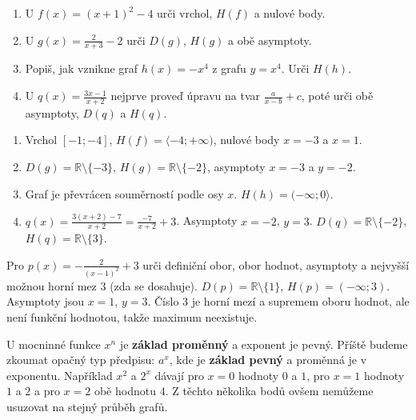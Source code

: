 \documentclass[11pt,a4paper]{article}
\begin{document}
\begin{zadaniReseniBox}[title={Samostatná práce 1}]
\begin{enumerate}[label=\alph*)]
\item U $f(x)=(x+1)^2-4$ urči vrchol, $H(f)$ a nulové body.
\item U $g(x)=\frac{2}{x+3}-2$ urči $D(g)$, $H(g)$ a obě asymptoty.
\item Popiš, jak vznikne graf $h(x)=-x^4$ z grafu $y=x^4$. Urči $H(h)$.
\item U $q(x)=\frac{3x-1}{x+2}$ nejprve proveď úpravu na tvar $\frac{a}{x-b}+c$, poté urči obě asymptoty, $D(q)$ a $H(q)$.
\end{enumerate}
\tcblower
\begin{enumerate}[label=\alph*)]
\item Vrchol $[-1;-4]$, $H(f)=\langle-4;+\infty)$, nulové body $x=-3$ a $x=1$.
\item $D(g)=\mathbb R\setminus\{-3\}$, $H(g)=\mathbb R\setminus\{-2\}$, asymptoty $x=-3$ a $y=-2$.
\item Graf je převrácen souměrností podle osy $x$. $H(h)=(-\infty;0\rangle$.
\item $q(x)=\frac{3(x+2)-7}{x+2}=\frac{-7}{x+2}+3$. Asymptoty $x=-2$, $y=3$. $D(q)=\mathbb R\setminus\{-2\}$, $H(q)=\mathbb R\setminus\{3\}$.
\end{enumerate}
\end{zadaniReseniBox}

\begin{zadaniReseniBox}[title={Rozšíření 1}]
Pro $p(x)=-\frac{2}{(x-1)^2}+3$ urči definiční obor, obor hodnot, asymptoty a nejvyšší možnou horní mez $3$ (zda se dosahuje).
\tcblower
$D(p)=\mathbb R\setminus\{1\}$, $H(p)=(-\infty;3)$. Asymptoty jsou $x=1$, $y=3$. Číslo $3$ je horní mezí a supremem oboru hodnot, ale není funkční hodnotou, takže maximum neexistuje.
\end{zadaniReseniBox}

U mocninné funkce $x^n$ je \textbf{základ proměnný} a exponent je pevný. Příště budeme zkoumat opačný typ předpisu: $a^x$, kde je \textbf{základ pevný} a proměnná je v exponentu. Například $x^2$ a $2^x$ dávají pro $x=0$ hodnoty $0$ a $1$, pro $x=1$ hodnoty $1$ a $2$ a pro $x=2$ obě hodnotu $4$. Z těchto několika bodů ovšem nemůžeme usuzovat na stejný průběh grafů.
\end{document}

